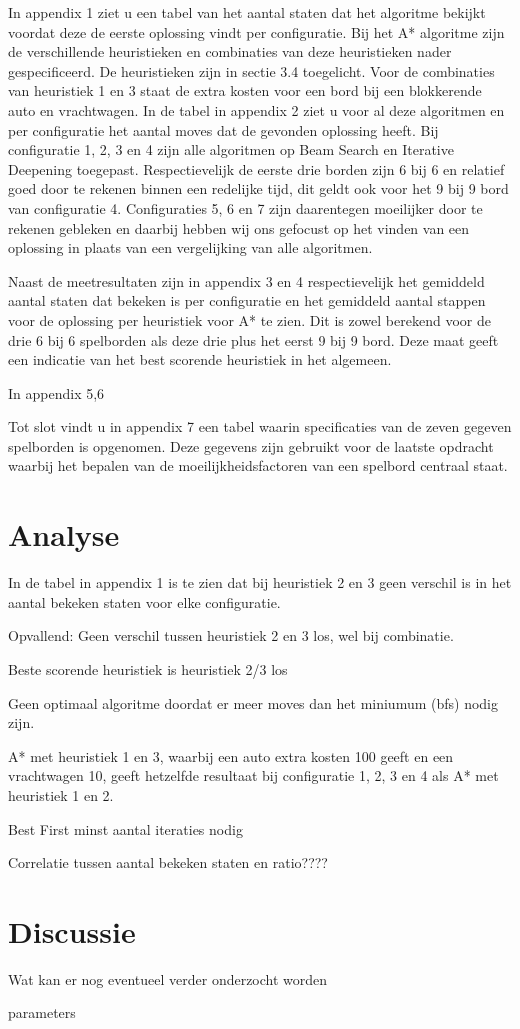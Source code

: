 \documentclass[a4paper]{article}
\begin{document}
    In appendix 1 ziet u een tabel van het aantal staten dat het algoritme bekijkt voordat deze de eerste oplossing vindt per configuratie. Bij het A* algoritme zijn de verschillende heuristieken en combinaties van deze heuristieken nader gespecificeerd. De heuristieken zijn in sectie 3.4 toegelicht. Voor de combinaties van heuristiek 1 en 3 staat de extra kosten voor een bord bij een blokkerende auto en vrachtwagen. In de tabel in appendix 2 ziet u voor al deze algoritmen en per configuratie het aantal moves dat de gevonden oplossing heeft. Bij configuratie 1, 2, 3 en 4 zijn alle algoritmen op Beam Search en Iterative Deepening toegepast. Respectievelijk de eerste drie borden zijn 6 bij 6 en relatief goed door te rekenen binnen een redelijke tijd, dit geldt ook voor het 9 bij 9 bord van configuratie 4. Configuraties 5, 6 en 7 zijn daarentegen moeilijker door te rekenen gebleken en daarbij hebben wij ons gefocust op het vinden van een oplossing in plaats van een vergelijking van alle algoritmen.
    	
        Naast de meetresultaten zijn in appendix 3 en 4 respectievelijk het gemiddeld aantal staten dat bekeken is per configuratie en het gemiddeld aantal stappen voor de oplossing per heuristiek voor A* te zien. Dit is zowel berekend voor de drie 6 bij 6 spelborden als deze drie plus het eerst 9 bij 9 bord. Deze maat geeft een indicatie van het best scorende heuristiek in het algemeen.
        
        In appendix 5,6
        
        
        Tot slot vindt u in appendix 7 een tabel waarin specificaties van de zeven gegeven spelborden is opgenomen. Deze gegevens zijn gebruikt voor de laatste opdracht waarbij het bepalen van de moeilijkheidsfactoren van een spelbord centraal staat.

\section{Analyse}
In de tabel in appendix 1 is te zien dat bij heuristiek 2 en 3 geen verschil is in het aantal bekeken staten voor elke configuratie. 


Opvallend:
Geen verschil tussen heuristiek 2 en 3 los, wel bij combinatie.

Beste scorende heuristiek is heuristiek 2/3 los

Geen optimaal algoritme doordat er meer moves dan het miniumum (bfs) nodig zijn.

A* met heuristiek 1 en 3, waarbij een auto extra kosten 100 geeft en een vrachtwagen 10, geeft hetzelfde resultaat bij configuratie 1, 2, 3 en 4 als A* met heuristiek 1 en 2.

Best First minst aantal iteraties nodig

Correlatie tussen aantal bekeken staten en ratio????


\section{Discussie}
Wat kan er nog eventueel verder onderzocht worden

parameters
  



\end{document}
